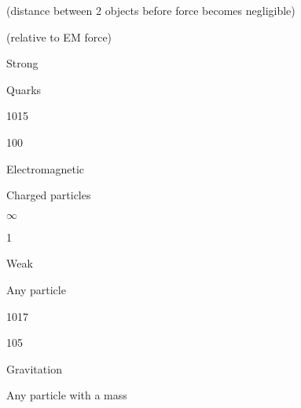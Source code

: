 \documentclass[letterpaper,10pt,english]{sphinxmanual}
\begin{document}
(distance between 2 objects before force becomes negligible)





(relative to EM force)









Strong





Quarks





10\sphinxhyphen{}15





100









Electromagnetic





Charged particles





\(\infty\)





1









Weak





Any particle





10\sphinxhyphen{}17





10\sphinxhyphen{}5









Gravitation





Any particle with a mass
\end{document}
